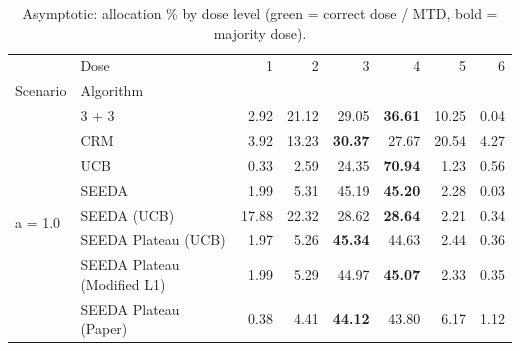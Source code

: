 \begin{table}[H]
\centering
\caption{Asymptotic: allocation \% by dose level (green = correct dose / MTD, bold = majority dose).}
\label{tab:asym_alloc_by_dose}
\begin{tabular}{llrrrrrr}
\toprule
 & Dose & 1 & 2 & 3 & 4 & 5 & 6 \\
Scenario & Algorithm &  &  &  &  &  &  \\
\midrule
\multirow[c]{8}{*}{a = 1.0} & 3 + 3 & 2.92 & 21.12 & {\cellcolor[HTML]{C8E6C9}} 29.05 & \bfseries 36.61 & 10.25 & 0.04 \\
 & CRM & 3.92 & 13.23 & {\cellcolor[HTML]{C8E6C9}} \bfseries 30.37 & 27.67 & 20.54 & 4.27 \\
 & UCB & 0.33 & 2.59 & {\cellcolor[HTML]{C8E6C9}} 24.35 & \bfseries 70.94 & 1.23 & 0.56 \\
 & SEEDA & 1.99 & 5.31 & {\cellcolor[HTML]{C8E6C9}} 45.19 & \bfseries 45.20 & 2.28 & 0.03 \\
 & SEEDA (UCB) & 17.88 & 22.32 & {\cellcolor[HTML]{C8E6C9}} 28.62 & \bfseries 28.64 & 2.21 & 0.34 \\
 & SEEDA Plateau (UCB) & 1.97 & 5.26 & {\cellcolor[HTML]{C8E6C9}} \bfseries 45.34 & 44.63 & 2.44 & 0.36 \\
 & SEEDA Plateau (Modified L1) & 1.99 & 5.29 & {\cellcolor[HTML]{C8E6C9}} 44.97 & \bfseries 45.07 & 2.33 & 0.35 \\
 & SEEDA Plateau (Paper) & 0.38 & 4.41 & {\cellcolor[HTML]{C8E6C9}} \bfseries 44.12 & 43.80 & 6.17 & 1.12 \\
\bottomrule
\end{tabular}
\end{table}
